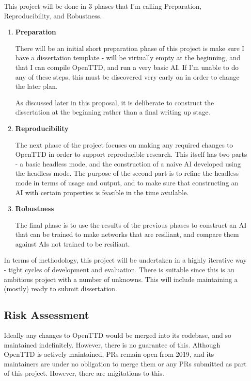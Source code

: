 \documentclass[a4paper,11pt]{article}
\begin{document}
This project will be done in 3 phases that I'm calling Preparation, Reproducibility, and Robustness.

\begin{enumerate}
\addtocounter{enumi}{-1}
    \item \textbf{Preparation}

    There will be an initial short preparation phase of this project is make sure I have a dissertation template - will be virtually empty at the beginning, and that I can compile OpenTTD, and run a very basic AI. If I'm unable to do any of these steps, this must be discovered very early on in order to change the later plan.

    As discussed later in this proposal, it is deliberate to construct the dissertation at the beginning rather than a final writing up stage.
    
    \item \textbf{Reproducibility}

    The next phase of the project focuses on making any required changes to OpenTTD in order to support reproducible research. This itself has two parts - a basic headless mode, and the construction of a naive AI developed using the headless mode. The purpose of the second part is to refine the headless mode in terms of usage and output, and to make sure that constructing an AI with certain properties is feasible in the time available.
    
    \item \textbf{Robustness}

    The final phase is to use the results of the previous phases to construct an AI that can be trained to make networks that are resiliant, and compare them against AIs not trained to be resiliant.
    
\end{enumerate}

In terms of methodology, this project will be undertaken in a highly iterative way - tight cycles of development and evaluation. There is suitable since this is an ambitious project with a number of unknowns. This will include maintaining a (mostly) ready to submit dissertation.

\subsection{Risk Assessment}
\label{riskassessment}

Ideally any changes to OpenTTD would be merged into its codebase, and so maintained indefinitely. However, there is no guarantee of this. Although OpenTTD is actively maintained, PRs remain open from 2019, and its maintainers are under no obligation to merge them or any PRs submitted as part of this project. However, there are migitations to this.
\end{document}
